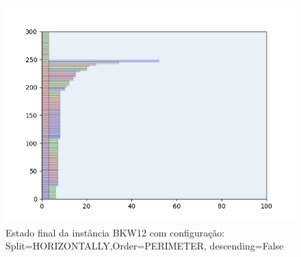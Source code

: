 \begin{figure}[H]
    \centering
    \caption[]{Estado final da instância BKW12 com configuração: Split=HORIZONTALLY,Order=PERIMETER, descending=False}
    \label{fig:bkw12-horizontally-perimeter-false}
    \includegraphics[scale=0.5]{output/figures/bkw/bkw12/horizontally/perimeter/false/000}
\end{figure}